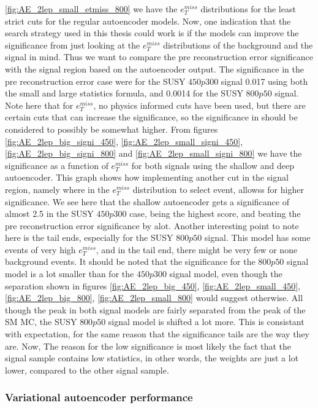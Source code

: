 \ref{fig:AE_2lep_small_etmiss_800} we have the $e_T^{miss}$ distributions for 
the least strict cuts for the regular autoencoder models. Now, one indication that the search strategy 
used in this thesis could work is if the models can improve the significance from just looking at 
the $e_T^{miss}$ distributions of the background and the signal in mind. Thus we want to compare the pre 
reconstruction error significance with the signal region based on the autoencoder output. The significance 
in the pre reconstruction error case were for the SUSY $450p300$ signal 0.017 using both the small and large 
statistics formula, and 0.0014 for the SUSY $800p50$ signal. Note here that for $e_T^{miss}$, no physics 
informed cuts have been used, but there are certain cuts that can increase the significance, so the significance
in should be considered to possibly be somewhat higher. From figures \ref{fig:AE_2lep_big_signi_450}, 
\ref{fig:AE_2lep_small_signi_450}, \ref{fig:AE_2lep_big_signi_800} and  \ref{fig:AE_2lep_small_signi_800} 
we have the significance as a function of $e_T^{miss}$ for both signals using the shallow and deep autoencoder. 
This graph shows how implementing another cut in the signal region, namely where in the $e_T^{miss}$ distribution 
to select event, allowss for higher significance. We see here that the shallow autoencoder gets a significance of 
almost 2.5 in the SUSY $450p300$ case, being the highest score, and beating the pre reconstruction error significance 
by alot. Another interesting point to note here is the tail ends, especially for the SUSY $800p50$ signal. 
This model has some events of very high $e_T^{miss}$, and in the tail end, there might be very few or none 
background events. It should be noted that the significance for the $800p50$ signal model is a lot smaller than 
for the $450p300$ signal model, even though the separation shown in figures \ref{fig:AE_2lep_big_450}, 
\ref{fig:AE_2lep_small_450}, \ref{fig:AE_2lep_big_800}, \ref{fig:AE_2lep_small_800} would suggest otherwise. 
All though the peak in both signal models are fairly separated from the peak of the SM MC, the SUSY $800p50$ 
signal model is shifted a lot more. This is consistant with expectation, for the same reason that the significance 
tails are the way they are.  Now, The reason for the low significance is most likely the fact that the signal 
sample contains low statistics, in other words, the weights are just a lot lower, compared to the other signal 
sample. \par

\subsubsection*{Variational autoencoder performance}

